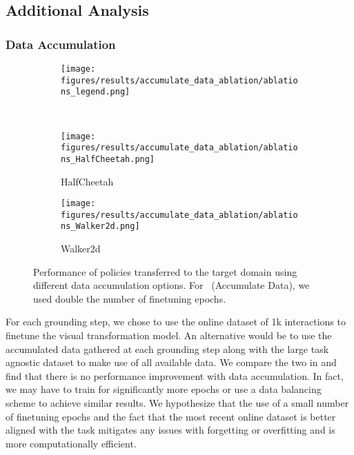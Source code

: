 \subsection{Additional Analysis}

\subsubsection{\textbf{Data Accumulation}}

\begin{figure}[ht]
    \centering
    \begin{subfigure}[t]{0.7\linewidth}        
        \texttt{[image: figures/results/accumulate\_data\_ablation/ablations\_legend.png]}
    \end{subfigure}
    \\
    \begin{subfigure}[t]{0.48\linewidth}
        \texttt{[image: figures/results/accumulate\_data\_ablation/ablations\_HalfCheetah.png]}
        \caption{HalfCheetah}
    \end{subfigure}
    \begin{subfigure}[t]{0.48\linewidth}
        \texttt{[image: figures/results/accumulate\_data\_ablation/ablations\_Walker2d.png]}
        \caption{Walker2d}
    \end{subfigure}
    \caption{
        Performance of policies transferred to the target domain using different data accumulation options.  For \method~(Accumulate Data), we used double the number of finetuning epochs.
    }
\label{fig:accumulate_data}
\end{figure}

For each grounding step, we chose to use the online dataset of 1k interactions to finetune the visual transformation model.  An alternative would be to use the accumulated data gathered at each grounding step along with the large task agnostic dataset to make use of all available data.  We compare the two in  and find that there is no performance improvement with data accumulation.  In fact, we may have to train for significantly more epochs or use a data balancing scheme to achieve similar results.  We hypothesize that the use of a small number of finetuning epochs and the fact that the most recent online dataset is better aligned with the task mitigates any issues with forgetting or overfitting and is more computationally efficient.






